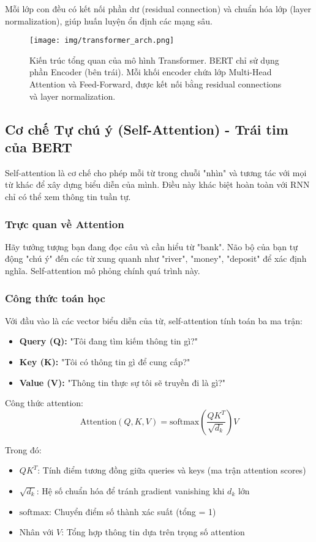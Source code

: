 Mỗi lớp con đều có kết nối phần dư (residual connection) và chuẩn hóa lớp (layer normalization), giúp huấn luyện ổn định các mạng sâu.

\begin{figure}[H]
    \centering
    \texttt{[image: img/transformer\_arch.png]}
    \caption{Kiến trúc tổng quan của mô hình Transformer. BERT chỉ sử dụng phần Encoder (bên trái). Mỗi khối encoder chứa lớp Multi-Head Attention và Feed-Forward, được kết nối bằng residual connections và layer normalization.}
    \label{fig:transformer_architecture}
\end{figure}

\subsection{Cơ chế Tự chú ý (Self-Attention) - Trái tim của BERT}
\label{ssec:self_attention}
Self-attention là cơ chế cho phép mỗi từ trong chuỗi "nhìn" và tương tác với mọi từ khác để xây dựng biểu diễn của mình. Điều này khác biệt hoàn toàn với RNN chỉ có thể xem thông tin tuần tự.

\subsubsection{Trực quan về Attention}
Hãy tưởng tượng bạn đang đọc câu và cần hiểu từ "bank". Não bộ của bạn tự động "chú ý" đến các từ xung quanh như "river", "money", "deposit" để xác định nghĩa. Self-attention mô phỏng chính quá trình này.

\subsubsection{Công thức toán học}
Với đầu vào là các vector biểu diễn của từ, self-attention tính toán ba ma trận:
\begin{itemize}
    \item \textbf{Query (Q):} "Tôi đang tìm kiếm thông tin gì?"
    \item \textbf{Key (K):} "Tôi có thông tin gì để cung cấp?"
    \item \textbf{Value (V):} "Thông tin thực sự tôi sẽ truyền đi là gì?"
\end{itemize}

Công thức attention:
$$ \text{Attention}(Q, K, V) = \text{softmax}\left(\frac{QK^T}{\sqrt{d_k}}\right)V $$

Trong đó:
\begin{itemize}
    \item $QK^T$: Tính điểm tương đồng giữa queries và keys (ma trận attention scores)
    \item $\sqrt{d_k}$: Hệ số chuẩn hóa để tránh gradient vanishing khi $d_k$ lớn
    \item $\text{softmax}$: Chuyển điểm số thành xác suất (tổng = 1)
    \item Nhân với $V$: Tổng hợp thông tin dựa trên trọng số attention
\end{itemize}

